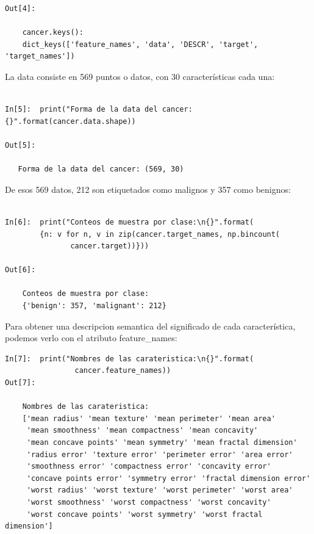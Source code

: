 {\begin{lstlisting}
Out[4]:
 
    cancer.keys():
    dict_keys(['feature_names', 'data', 'DESCR', 'target', 'target_names'])

\end{lstlisting}


\noindent La data consiste en 569 puntos o datos, con 30 características cada una:\\


\begin{lstlisting}

In[5]:  print("Forma de la data del cancer: {}".format(cancer.data.shape))

Out[5]:

   Forma de la data del cancer: (569, 30)

 \end{lstlisting} 
 
\noindent  De esos  569 datos, 212  son etiquetados como malignos y 357 como benignos:\\

\begin{lstlisting}

In[6]:  print("Conteos de muestra por clase:\n{}".format(
        {n: v for n, v in zip(cancer.target_names, np.bincount(
               cancer.target))}))
               
Out[6]:

    Conteos de muestra por clase:
    {'benign': 357, 'malignant': 212}
\end{lstlisting}



Para obtener una descripcion semantica del significado de cada característica, podemos verlo con 
el atributo  {\ttfamily feature\_names}:\\

\begin{lstlisting}
In[7]:  print("Nombres de las carateristica:\n{}".format(
                cancer.feature_names))
Out[7]:

    Nombres de las carateristica:
    ['mean radius' 'mean texture' 'mean perimeter' 'mean area'
     'mean smoothness' 'mean compactness' 'mean concavity'
     'mean concave points' 'mean symmetry' 'mean fractal dimension'
     'radius error' 'texture error' 'perimeter error' 'area error'
     'smoothness error' 'compactness error' 'concavity error'
     'concave points error' 'symmetry error' 'fractal dimension error'
     'worst radius' 'worst texture' 'worst perimeter' 'worst area'
     'worst smoothness' 'worst compactness' 'worst concavity'
     'worst concave points' 'worst symmetry' 'worst fractal dimension']
\end{lstlisting}


}
